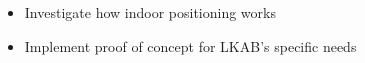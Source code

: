 \begin{itemize}
    \item Investigate how indoor positioning works
    \item Implement proof of concept for LKAB's specific needs
\end{itemize}